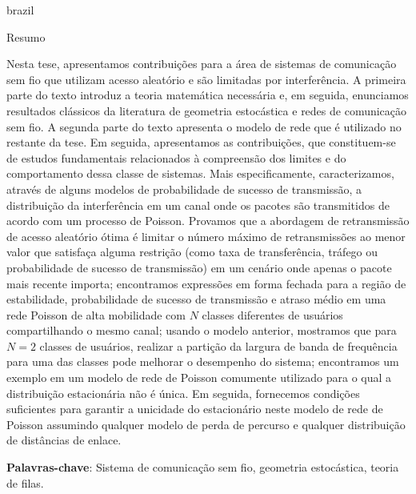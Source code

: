 \begin{resumo}
    \begin{otherlanguage*}{brazil}
    \begin{center}{\ABNTEXchapterfont\huge Resumo}\end{center}
    Nesta tese, apresentamos contribuições para a área de sistemas de comunicação sem fio que utilizam acesso aleatório e são limitadas por interferência.
    A primeira parte do texto introduz a teoria matemática necessária e, em seguida, enunciamos resultados clássicos da literatura de geometria estocástica e redes de comunicação sem fio.
    A segunda parte do texto apresenta o modelo de rede que é utilizado no restante da tese.
    Em seguida, apresentamos as contribuições, que constituem-se de estudos fundamentais relacionados à compreensão dos limites e do comportamento dessa classe de sistemas.
    Mais especificamente, caracterizamos, através de alguns modelos de probabilidade de sucesso de transmissão, a distribuição da interferência em um canal onde os pacotes são transmitidos de acordo com um processo de Poisson.
    Provamos que a abordagem de retransmissão de acesso aleatório ótima é limitar o número máximo de retransmissões ao menor valor que satisfaça alguma restrição (como taxa de transferência, tráfego ou probabilidade de sucesso de transmissão) em um cenário onde apenas o pacote mais recente importa;
    encontramos expressões em forma fechada para a região de estabilidade, probabilidade de sucesso de transmissão e atraso médio em uma rede Poisson de alta mobilidade com $N$ classes diferentes de usuários compartilhando o mesmo canal;
    usando o modelo anterior, mostramos que para $ N = 2 $ classes de usuários, realizar a partição da largura de banda de frequência para uma das classes pode melhorar o desempenho do sistema;
    encontramos um exemplo em um modelo de rede de Poisson comumente utilizado para o qual a distribuição estacionária não é única. Em seguida, fornecemos condições suficientes para garantir a unicidade do estacionário neste modelo de rede de Poisson assumindo qualquer modelo de perda de percurso e qualquer distribuição de distâncias de enlace.
    \vspace{\onelineskip}

    \noindent\textbf{Palavras-chave}: Sistema de comunicação sem fio, geometria estocástica, teoria de filas.

    \end{otherlanguage*}
\end{resumo}


